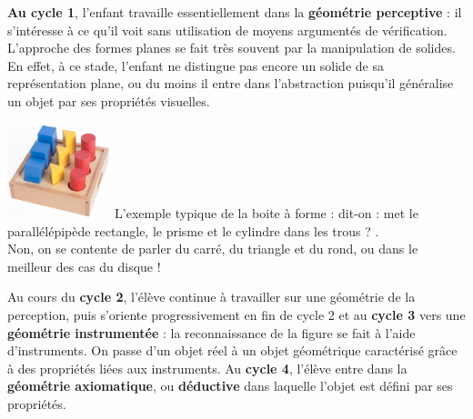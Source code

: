 {\bf Au cycle 1}, l'enfant travaille essentiellement dans la {\bf géométrie perceptive} : il s'intéresse à ce qu'il voit sans utilisation de moyens argumentés de vérification. L’approche des formes planes se fait très souvent par la manipulation de solides. En effet, à ce stade, l'enfant ne distingue pas encore un solide de sa représentation plane, ou du moins il entre dans l'abstraction puisqu'il généralise un objet par ses propriétés visuelles. 
\begin{exemple}
   \hspace*{1.5cm} \includegraphics[width=3cm]{Geometrie_did/Images/Geo5_cours_boite_formes}
   \correction
   L'exemple typique de la boite à forme : dit-on : \og met le parallélépipède rectangle, le prisme et le cylindre dans les trous ? \fg. \\
   Non, on se contente de parler du carré, du triangle et du rond, ou dans le meilleur des cas du disque !
\end{exemple}

\smallskip

Au cours du {\bf cycle 2}, l’élève continue à travailler sur une géométrie de la perception, puis s'oriente progressivement en fin de cycle 2 et au {\bf cycle 3} vers une {\bf géométrie instrumentée} : la reconnaissance de la figure se fait à l'aide d'instruments. On passe d'un objet réel à un objet géométrique caractérisé grâce à  des propriétés liées aux instruments. Au {\bf cycle 4}, l’élève entre dans la {\bf géométrie axiomatique}, ou {\bf déductive} dans laquelle l'objet est défini par ses propriétés.


